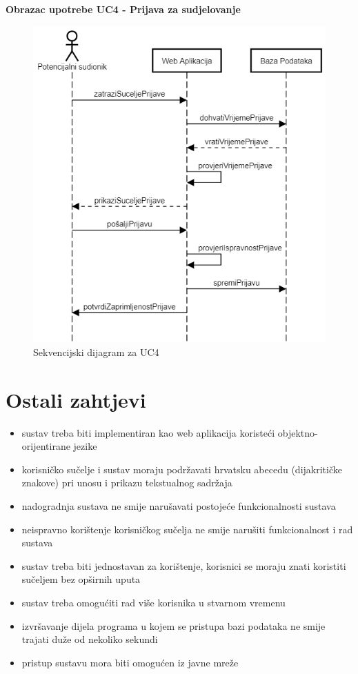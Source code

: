 \newpage
\textbf{Obrazac upotrebe UC4 - Prijava za sudjelovanje}
\begin{figure}[H]
	\centering
	\includegraphics[scale=0.6]{dijagrami/UC4.PNG}
	\caption{Sekvencijski dijagram za UC4}
	\label{fig: uc4 sekv}
\end{figure}


\newpage
\section{Ostali zahtjevi}
\begin{itemize}
	\item sustav treba biti implementiran kao web aplikacija koristeći objektno-orijentirane jezike
	\item korisničko sučelje i sustav moraju podržavati hrvatsku abecedu (dijakritičke znakove) pri unosu i prikazu tekstualnog sadržaja
	\item nadogradnja sustava ne smije narušavati postojeće funkcionalnosti sustava
	\item neispravno korištenje korisničkog sučelja ne smije narušiti funkcionalnost i rad sustava
	\item sustav treba biti jednostavan za korištenje, korisnici se moraju znati koristiti sučeljem bez opširnih uputa
	\item sustav treba omogućiti rad više korisnika u stvarnom vremenu
	\item izvršavanje dijela programa u kojem se pristupa bazi podataka ne smije trajati duže od nekoliko sekundi
	\item pristup sustavu mora biti omogućen iz javne mreže
\end{itemize}